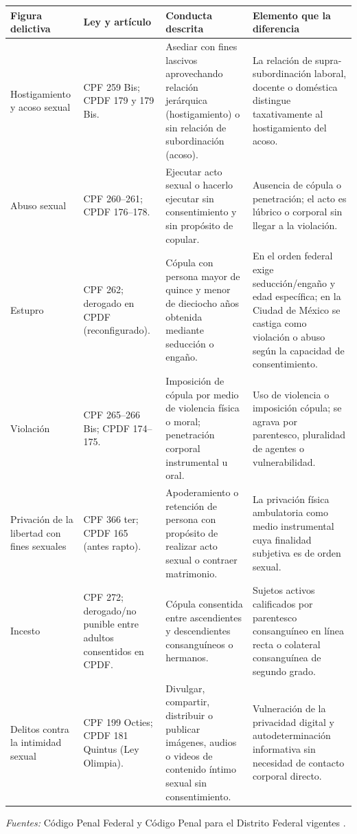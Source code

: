\documentclass[spanish,letterpaper,oneside]{article}
\renewcommand{\arraystretch}{1.08}
\begin{document}
\begingroup\fontsize{9.5}{11}\selectfont
\renewcommand{\arraystretch}{1.15}
\begin{tabularx}{\linewidth}{@{}>{\raggedright\arraybackslash}p{2.6cm}>{\raggedright\arraybackslash}p{2.6cm}>{\raggedright\arraybackslash}X>{\raggedright\arraybackslash}X@{}}
\toprule
\textbf{Figura delictiva} & \textbf{Ley y artículo} & \textbf{Conducta descrita} & \textbf{Elemento que la diferencia} \\
\midrule
Hostigamiento y acoso sexual & CPF 259 Bis; CPDF 179 y 179 Bis. & Asediar con fines lascivos aprovechando relación jerárquica (hostigamiento) o sin relación de subordinación (acoso). & La relación de supra-subordinación laboral, docente o doméstica distingue taxativamente al hostigamiento del acoso. \\
\midrule
Abuso sexual & CPF 260--261; CPDF 176--178. & Ejecutar acto sexual o hacerlo ejecutar sin consentimiento y sin propósito de copular. & Ausencia de cópula o penetración; el acto es lúbrico o corporal sin llegar a la violación. \\
\midrule
Estupro & CPF 262; derogado en CPDF (reconfigurado). & Cópula con persona mayor de quince y menor de dieciocho años obtenida mediante seducción o engaño. & En el orden federal exige seducción/engaño y edad específica; en la Ciudad de México se castiga como violación o abuso según la capacidad de consentimiento. \\
\midrule
Violación & CPF 265--266 Bis; CPDF 174--175. & Imposición de cópula por medio de violencia física o moral; penetración corporal instrumental u oral. & Uso de violencia o imposición cópula; se agrava por parentesco, pluralidad de agentes o vulnerabilidad. \\
\midrule
Privación de la libertad con fines sexuales & CPF 366 ter; CPDF 165 (antes rapto). & Apoderamiento o retención de persona con propósito de realizar acto sexual o contraer matrimonio. & La privación física ambulatoria como medio instrumental cuya finalidad subjetiva es de orden sexual. \\
\midrule
Incesto & CPF 272; derogado/no punible entre adultos consentidos en CPDF. & Cópula consentida entre ascendientes y descendientes consanguíneos o hermanos. & Sujetos activos calificados por parentesco consanguíneo en línea recta o colateral consanguínea de segundo grado. \\
\midrule
Delitos contra la intimidad sexual & CPF 199 Octies; CPDF 181 Quintus (Ley Olimpia). & Divulgar, compartir, distribuir o publicar imágenes, audios o videos de contenido íntimo sexual sin consentimiento. & Vulneración de la privacidad digital y autodeterminación informativa sin necesidad de contacto corporal directo. \\
\bottomrule
\end{tabularx}
\par\vspace{2pt}\textit{Fuentes:} Código Penal Federal y Código Penal para el Distrito Federal vigentes \citep{cpfS4Vigente,cpdfS4Vigente}.
\endgroup
\end{document}
